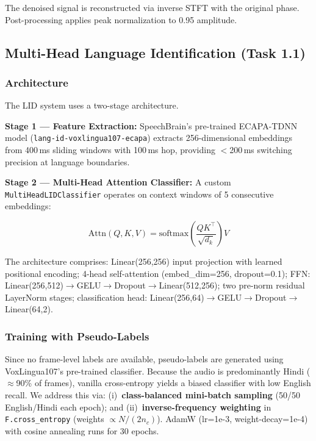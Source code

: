 \documentclass[11pt]{article}
\begin{document}
The denoised signal is reconstructed via inverse STFT with the original phase.
Post-processing applies peak normalization to 0.95 amplitude.

\subsection{Multi-Head Language Identification (Task 1.1)}

\subsubsection{Architecture}

The LID system uses a two-stage architecture.

\textbf{Stage 1 --- Feature Extraction:} SpeechBrain's pre-trained
ECAPA-TDNN model (\texttt{lang-id-voxlingua107-ecapa}) extracts
256-dimensional embeddings from 400\,ms sliding windows with 100\,ms hop,
providing $<$200\,ms switching precision at language boundaries.

\textbf{Stage 2 --- Multi-Head Attention Classifier:} A custom
\texttt{MultiHeadLIDClassifier} operates on context windows of 5
consecutive embeddings:

\begin{equation}
  \mathrm{Attn}(Q,K,V) = \mathrm{softmax}\!\left(\frac{QK^\top}{\sqrt{d_k}}\right)V
\end{equation}

The architecture comprises: Linear(256,256) input projection with learned
positional encoding; 4-head self-attention (embed\_dim=256, dropout=0.1);
FFN: Linear(256,512)$\to$GELU$\to$Dropout$\to$Linear(512,256); two
pre-norm residual LayerNorm stages; classification head:
Linear(256,64)$\to$GELU$\to$Dropout$\to$Linear(64,2).

\subsubsection{Training with Pseudo-Labels}

Since no frame-level labels are available, pseudo-labels are generated using
VoxLingua107's pre-trained classifier. Because the audio is predominantly
Hindi ($\approx$90\% of frames), vanilla cross-entropy yields a biased
classifier with low English recall. We address this via:
(i)~\textbf{class-balanced mini-batch sampling} (50/50 English/Hindi each
epoch); and (ii)~\textbf{inverse-frequency weighting} in
\texttt{F.cross\_entropy} (weights $\propto N/(2n_c)$). AdamW
(lr=1e-3, weight-decay=1e-4) with cosine annealing runs for 30 epochs.
\end{document}
